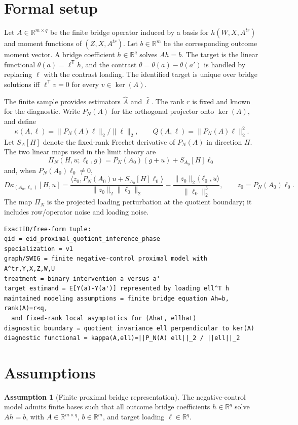 \documentclass[11pt]{article}
\newcommand{\transpose}{\mathsf{T}}
\newcommand{\R}{\mathbb{R}}
\theoremstyle{definition}
\newtheorem{assumption}{Assumption}
\theoremstyle{plain}
\theoremstyle{remark}
\begin{document}
\section{Formal setup}
Let \(A\in\R^{m\times q}\) be the finite bridge operator induced by a basis for \(h(W,X,A^{tr})\) and moment functions of \((Z,X,A^{tr})\). Let \(b\in\R^m\) be the corresponding outcome moment vector. A bridge coefficient \(h\in\R^q\) solves \(Ah=b\). The target is the linear functional \(\theta(a)=\ell^\transpose h\), and the contrast \(\theta=\theta(a)-\theta(a')\) is handled by replacing \(\ell\) with the contrast loading. The identified target is unique over bridge solutions iff \(\ell^\transpose v=0\) for every \(v\in\ker(A)\).

The finite sample provides estimators \(\widehat A\) and \(\widehat\ell\). The rank \(r\) is fixed and known for the diagnostic. Write \(P_N(A)\) for the orthogonal projector onto \(\ker(A)\), and define
\[
        \kappa(A,\ell)=\|P_N(A)\ell\|_2/\|\ell\|_2,\qquad
        Q(A,\ell)=\|P_N(A)\ell\|_2^2 .
\]
Let \(S_A[H]\) denote the fixed-rank Frechet derivative of \(P_N(A)\) in direction \(H\). The two linear maps used in the limit theory are
\[
        \Pi_N(H,u;\ell_0,g)=P_N(A_0)(g+u)+S_{A_0}[H]\ell_0
\]
and, when \(P_N(A_0)\ell_0\ne0\),
\[
        D\kappa_{(A_0,\ell_0)}[H,u]
        =\frac{\langle z_0, P_N(A_0)u+S_{A_0}[H]\ell_0\rangle}{\|z_0\|_2\|\ell_0\|_2}
        -\frac{\|z_0\|_2\langle \ell_0,u\rangle}{\|\ell_0\|_2^3},
        \qquad z_0=P_N(A_0)\ell_0 .
\]
The map \(\Pi_N\) is the projected loading perturbation at the quotient boundary; it includes row/operator noise and loading noise.

\begin{verbatim}
ExactID/free-form tuple:
qid = eid_proximal_quotient_inference_phase
specialization = v1
graph/SWIG = finite negative-control proximal model with A^tr,Y,X,Z,W,U
treatment = binary intervention a versus a'
target estimand = E[Y(a)-Y(a')] represented by loading ell^T h
maintained modeling assumptions = finite bridge equation Ah=b, rank(A)=r<q,
  and fixed-rank local asymptotics for (Ahat, ellhat)
diagnostic boundary = quotient invariance ell perpendicular to ker(A)
diagnostic functional = kappa(A,ell)=||P_N(A) ell||_2 / ||ell||_2
\end{verbatim}

\section{Assumptions}
\begin{assumption}[Finite proximal bridge representation]\label{ass:finite-bridge}
The negative-control model admits finite bases such that all outcome bridge coefficients \(h\in\R^q\) solve \(Ah=b\), with \(A\in\R^{m\times q}\), \(b\in\R^m\), and target loading \(\ell\in\R^q\).
\end{assumption}
\end{document}

